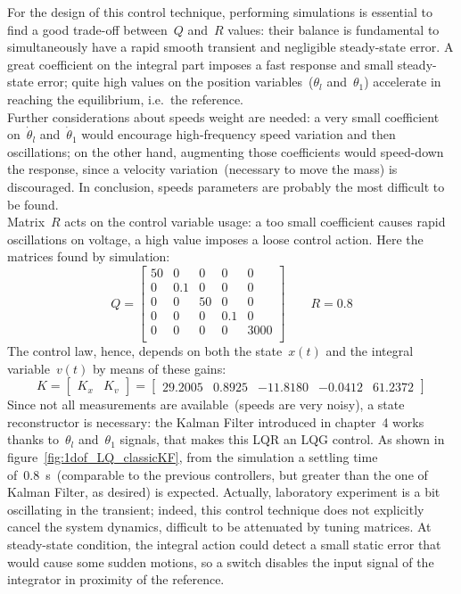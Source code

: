 For the design of this control technique, performing simulations is essential to find a good trade-off between~$Q$ and~$R$ values: their balance is fundamental to simultaneously have a rapid smooth transient and negligible steady-state error. A great coefficient on the integral part imposes a fast response and small steady-state error; quite high values on the position variables~($\theta_l$ and~$\theta_1$) accelerate in reaching the equilibrium, i.e.\ the reference. \\ Further considerations about speeds weight are needed: a very small coefficient on~$\dot \theta_l$ and~$\dot \theta_1$ would encourage high-frequency speed variation and then oscillations; on the other hand, augmenting those coefficients would speed-down the response, since a velocity variation~(necessary to move the mass) is discouraged. In conclusion, speeds parameters are probably the most difficult to be found. \\ Matrix~$R$ acts on the control variable usage: a too small coefficient causes rapid oscillations on voltage, a high value imposes a loose control action.
Here the matrices found by simulation:
\[
	Q =
	\begin{bmatrix}
		50 & 0 & 0 & 0 & 0 \\
		0 & 0.1 & 0 & 0 & 0 \\
		0 & 0 & 50 & 0 & 0 \\
		0 & 0 & 0 & 0.1 & 0 \\
		0 & 0 & 0 & 0 & 3000 \\
	\end{bmatrix}
	\qquad
	R = 0.8
\]
The control law, hence, depends on both the state~$x(t)$ and the integral variable~$v(t)$ by means of these gains:
\begin{equation}
	K =
	\left[
	\begin{array}{c|c}
		K_x & K_v
	\end{array}
	\right]
	=
	\left[
	\begin{array}{cccc|c}
		29.2005 & 0.8925 & -11.8180 & -0.0412 & 61.2372
	\end{array}
	\right]
	\label{eq:1dof_LQ_fastK}
\end{equation}
 Since not all measurements are available~(speeds are very noisy), a state reconstructor is necessary: the Kalman Filter introduced in chapter~4 works thanks to~$\theta_l$ and~$\theta_1$ signals, that makes this LQR an LQG control. As shown in figure~\ref{fig:1dof_LQ_classicKF}, from the simulation a settling time of~0.8~s~(comparable to the previous controllers, but greater than the one of Kalman Filter, as desired) is expected. Actually, laboratory experiment is a bit oscillating in the transient; indeed, this control technique does not explicitly cancel the system dynamics, difficult to be attenuated by tuning matrices. At steady-state condition, the integral action could detect a small static error that would cause some sudden motions, so a switch disables the input signal of the integrator in proximity of the reference.

